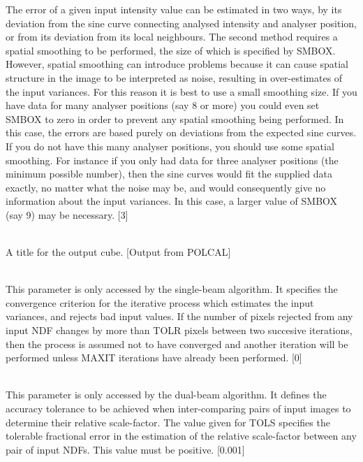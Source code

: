 \documentclass[twoside,11pt]{article}
\renewcommand{\_}{\texttt{\symbol{95}}}
\newcommand{\sstsubsection}[1]{ \item[{#1}] \mbox{} \\}
\newcommand{\sstsubsection}[1]{\item[{#1}]}
\begin{document}
{{{         The error of a given input intensity value can be estimated
         in two ways, by its deviation from the sine curve connecting
         analysed intensity and analyser position, or from its deviation
         from its local neighbours. The second method requires a spatial
         smoothing to be performed, the size of which is specified by
         SMBOX. However, spatial smoothing can introduce problems because
         it can cause spatial structure in the image to be interpreted as
         noise, resulting in over-estimates of the input variances. For
         this reason it is best to use a small smoothing size. If you
         have data for many analyser positions (say 8 or more) you could
         even set SMBOX to zero in order to prevent any spatial smoothing
         being performed. In this case, the errors are based purely on
         deviations from the expected sine curves. If you do not have
         this many analyser positions, you should use some spatial
         smoothing. For instance if you only had data for three analyser
         positions (the minimum possible number), then the sine curves
         would fit the supplied data exactly, no matter what the noise
         may be, and would consequently give no information about the input
         variances. In this case, a larger value of SMBOX (say 9) may be
         necessary. [3]
      }
      \sstsubsection{
         TITLE = LITERAL (Read)
      }{
         A title for the output cube. [Output from POLCAL]
      }
      \sstsubsection{
         TOLR = \_INTEGER (Read)
      }{
         This parameter is only accessed by the single-beam algorithm. It
         specifies the convergence criterion for the iterative process
         which estimates the input variances, and rejects bad input values.
         If the number of pixels rejected from any input NDF changes by more
         than TOLR pixels between two succesive iterations, then the process
         is assumed not to have converged and another iteration will be
         performed unless MAXIT iterations have already been performed. [0]
      }
      \sstsubsection{
         TOLS = \_REAL (Read)
      }{
         This parameter is only accessed by the dual-beam algorithm. It
         defines the accuracy tolerance to be achieved when inter-comparing
         pairs of input images to determine their relative scale-factor. The
         value given for TOLS specifies the tolerable fractional error in the
         estimation of the relative scale-factor between any pair of input
         NDFs. This value must be positive. [0.001]
}}}
\end{document}
